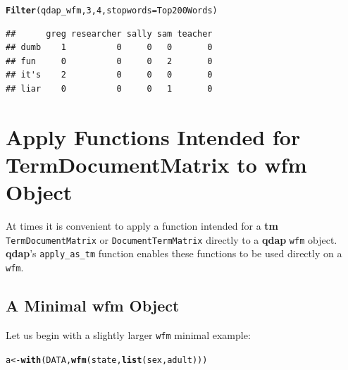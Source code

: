 \documentclass{article}\usepackage[]{graphicx}\usepackage[]{color}
\makeatletter
\newcommand{\hlnum}[1]{\textcolor[rgb]{0.686,0.059,0.569}{#1}}%
\newcommand{\hlstd}[1]{\textcolor[rgb]{0.345,0.345,0.345}{#1}}%
\newcommand{\hlkwb}[1]{\textcolor[rgb]{0.69,0.353,0.396}{#1}}%
\newcommand{\hlkwc}[1]{\textcolor[rgb]{0.333,0.667,0.333}{#1}}%
\newcommand{\hlkwd}[1]{\textcolor[rgb]{0.737,0.353,0.396}{\textbf{#1}}}%
\newenvironment{kframe}{%
 \def\at@end@of@kframe{}%
 \ifinner\ifhmode%
  \def\at@end@of@kframe{\end{minipage}}%
  \begin{minipage}{\columnwidth}%
 \fi\fi%
 \def\FrameCommand##1{\hskip\@totalleftmargin \hskip-\fboxsep
 \colorbox{shadecolor}{##1}\hskip-\fboxsep
     \hskip-\linewidth \hskip-\@totalleftmargin \hskip\columnwidth}%
 \MakeFramed {\advance\hsize-\width
   \@totalleftmargin\z@ \linewidth\hsize
   \@setminipage}}%
 {\par\unskip\endMakeFramed%
 \at@end@of@kframe}
\newenvironment{knitrout}{}{} %
\makeatother
\begin{document}
\begin{knitrout}
\color{fgcolor}\begin{kframe}
\begin{alltt}
\hlkwd{Filter}\hlstd{(qdap_wfm,} \hlnum{3}\hlstd{,} \hlnum{4}\hlstd{,} \hlkwc{stopwords} \hlstd{= Top200Words)}
\end{alltt}
\end{kframe}
\end{knitrout}


\begin{knitrout}
\color{fgcolor}\begin{kframe}
\begin{verbatim}
##      greg researcher sally sam teacher
## dumb    1          0     0   0       0
## fun     0          0     0   2       0
## it's    2          0     0   0       0
## liar    0          0     0   1       0
\end{verbatim}
\end{kframe}
\end{knitrout}



\section{Apply Functions Intended for TermDocumentMatrix to wfm Object}

At times it is convenient to apply a function intended for a \textbf{tm} \texttt{TermDocumentMatrix} or \texttt{DocumentTermMatrix} directly to a \textbf{qdap} \texttt{wfm} object.  \textbf{qdap}'s \texttt{apply\_as\_tm} function enables these functions to be used directly on a \texttt{wfm}.

\subsection{A Minimal wfm Object}

Let us begin with a slightly larger \texttt{wfm} minimal example:

\begin{knitrout}
\color{fgcolor}\begin{kframe}
\begin{alltt}
\hlstd{a} \hlkwb{<-} \hlkwd{with}\hlstd{(DATA,} \hlkwd{wfm}\hlstd{(state,} \hlkwd{list}\hlstd{(sex, adult)))}
\end{alltt}
\end{kframe}
\end{knitrout}
\end{document}
